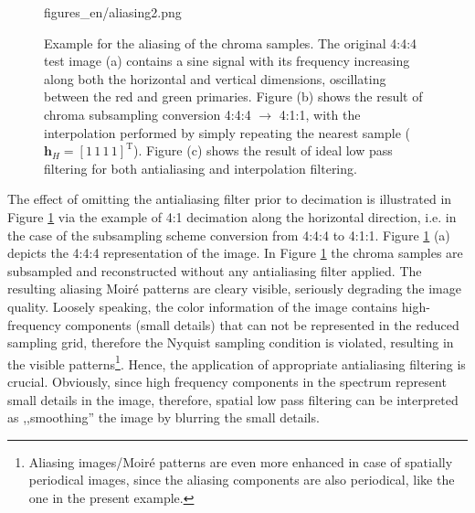 \begin{figure}[h!]
	\centering
	\begin{overpic}[width = 0.75\columnwidth ]{figures_en/aliasing2.png}
 	\end{overpic}
	\caption{
	Example for the aliasing of the chroma samples.
	The original 4:4:4 test image (a) contains a sine signal with its frequency increasing along both the horizontal and vertical dimensions, oscillating between the red and green primaries.
	Figure (b) shows the result of chroma subsampling conversion 4:4:4 $\rightarrow$ 4:1:1, with the interpolation performed by simply repeating the nearest sample ($\mathbf{h}_H= \left[ 1\,1 \,1 \,1 \right]^{\mathrm{T}}$).
	Figure (c) shows the result of ideal low pass filtering for both antialiasing and interpolation filtering.}
	\label{Fig:chroma_subsampling}
\end{figure}
\vspace{3mm}
The effect of omitting the antialiasing filter prior to decimation is illustrated in Figure \ref{Fig:chroma_subsampling} via the example of 4:1 decimation along the horizontal direction, i.e. in the case of the subsampling scheme conversion from 4:4:4 to 4:1:1.
Figure \ref{Fig:chroma_subsampling} (a) depicts the 4:4:4 representation of the image.
In Figure \ref{Fig:chroma_subsampling} the chroma samples are subsampled and reconstructed without any antialiasing filter applied.
The resulting aliasing Moiré patterns are cleary visible, seriously degrading the image quality.
Loosely speaking, the color information of the image contains high-frequency components (small details) that can not be represented in the reduced sampling grid, therefore the Nyquist sampling condition is violated, resulting in the visible patterns\footnote{Aliasing images/Moiré patterns are even more enhanced in case of spatially periodical images, since the aliasing components are also periodical, like the one in the present example.}.
Hence, the application of appropriate antialiasing filtering is crucial.
Obviously, since high frequency components in the spectrum represent small details in the image, therefore, spatial low pass filtering can be interpreted as ,,smoothing'' the image by blurring the small details.

